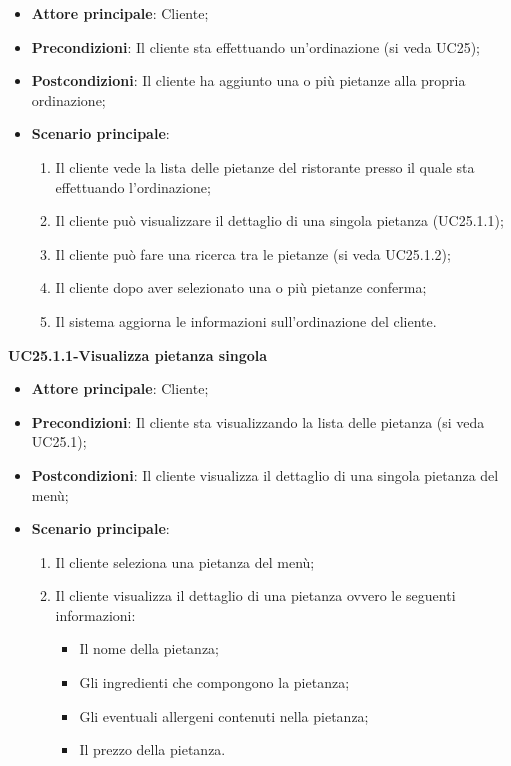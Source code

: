 \begin{itemize}
\item \textbf{Attore principale}: Cliente;
\item \textbf{Precondizioni}: Il cliente sta effettuando un'ordinazione (si veda UC25);
\item \textbf{Postcondizioni}: Il cliente ha aggiunto una o più pietanze alla propria ordinazione;
\item \textbf{Scenario principale}:
\begin{enumerate}
\item Il cliente vede la lista delle pietanze del ristorante presso il quale sta effettuando l'ordinazione;
\item Il cliente può visualizzare il dettaglio di una singola pietanza (UC25.1.1);
\item Il cliente può fare una ricerca tra le pietanze (si veda UC25.1.2);
\item Il cliente dopo aver selezionato una o più pietanze conferma;
\item Il sistema aggiorna le informazioni sull'ordinazione del cliente.
\end{enumerate}
\end{itemize}

\textbf{UC25.1.1-Visualizza pietanza singola}

\begin{itemize}
\item \textbf{Attore principale}: Cliente;
\item \textbf{Precondizioni}: Il cliente sta visualizzando la lista delle pietanza (si veda UC25.1);
\item \textbf{Postcondizioni}: Il cliente visualizza il dettaglio di una singola pietanza del menù;
\item \textbf{Scenario principale}:
\begin{enumerate}
\item Il cliente seleziona una pietanza del menù;
\item Il cliente visualizza il dettaglio di una pietanza ovvero le seguenti informazioni:
\begin{itemize}
\item Il nome della pietanza;
\item Gli ingredienti che compongono la pietanza;
\item Gli eventuali allergeni contenuti nella pietanza;
\item Il prezzo della pietanza.
\end{itemize}
\end{enumerate}
\end{itemize}

